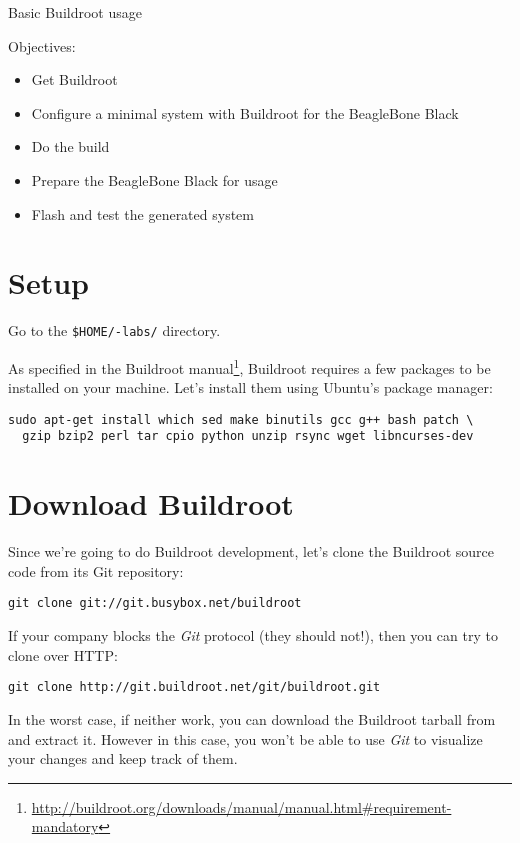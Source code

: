 \subchapter
{Basic Buildroot usage}
{Objectives:
  \begin{itemize}
  \item Get Buildroot
  \item Configure a minimal system with Buildroot for the BeagleBone
    Black
  \item Do the build
  \item Prepare the BeagleBone Black for usage
  \item Flash and test the generated system
  \end{itemize}
}

\section{Setup}

Go to the {\tt \$HOME/\longname-labs/} directory.

As specified in the Buildroot
manual\footnote{\url{http://buildroot.org/downloads/manual/manual.html\#requirement-mandatory}},
Buildroot requires a few packages to be installed on your
machine. Let's install them using Ubuntu's package manager:

\begin{verbatim}
sudo apt-get install which sed make binutils gcc g++ bash patch \
  gzip bzip2 perl tar cpio python unzip rsync wget libncurses-dev
\end{verbatim}

\section{Download Buildroot}

Since we're going to do Buildroot development, let's clone the
Buildroot source code from its Git repository:

\begin{verbatim}
git clone git://git.busybox.net/buildroot
\end{verbatim}

If your company blocks the {\em Git} protocol (they should not!), then
you can try to clone over HTTP:

\begin{verbatim}
git clone http://git.buildroot.net/git/buildroot.git
\end{verbatim}

In the worst case, if neither work, you can download the Buildroot
tarball \code{buildroot-2015.02.tar.bz2} from
 and extract it. However in this
case, you won't be able to use {\em Git} to visualize your changes and
keep track of them.

